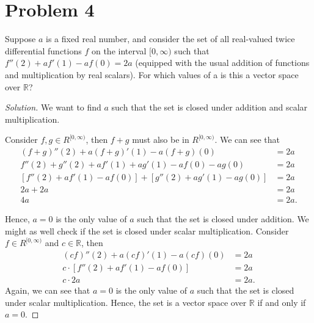 \documentclass{article}
\begin{document}
\section*{Problem 4}
Suppose $a$ is a fixed real number, and consider the set of all real-valued twice differential 
functions $f$ on the interval $[0, \infty)$ such that $f''(2) + af'(1) - af(0) = 2a$ (equipped with 
the usual addition of functions and multiplication by real scalars). For which values of a is this 
a vector space over $\mathbb{R}$?
\begin{proof}[Solution]
    We want to find $a$ such that the set is closed under addition and scalar multiplication.
    
    Consider $f, g \in R^{[0, \infty)}$, then $f + g$ must also be in $R^{[0, \infty)}$. We can see 
    that
    \begin{align*}
        (f + g)''(2) + a(f + g)'(1) - a(f + g)(0) & = 2a \\
        f''(2) + g''(2) + af'(1) + ag'(1) - af(0) - ag(0) & = 2a \\
        \left[f''(2) + af'(1) - af(0)\right] + [g''(2) + ag'(1) - ag(0)] & = 2a \\
        2a + 2a & = 2a \\
        4a & = 2a.
    \end{align*}

    Hence, $a = 0$ is the only value of $a$ such that the set is closed under addition. We might 
    as well check if the set is closed under scalar multiplication. Consider $f \in R^{[0, \infty)}$ 
    and $c \in \mathbb{R}$, then 
    \begin{align*}
        (cf)''(2) + a(cf)'(1) - a(cf)(0) & = 2a \\
        c \cdot [f''(2) + af'(1) - af(0)] & = 2a \\
        c \cdot 2a & = 2a.
    \end{align*}
    Again, we can see that $a = 0$ is the only value of $a$ such that the set is closed under 
    scalar multiplication. Hence, the set is a vector space over $\mathbb{R}$ if and only if 
    $a = 0$.
\end{proof}
\end{document}
